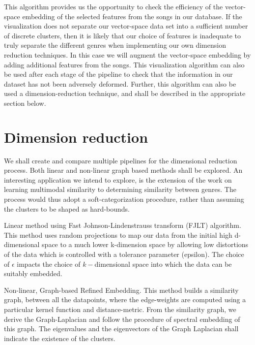 \documentclass[12pt]{article}
\begin{document}
This algorithm provides us the opportunity to check the efficiency of the vector-space embedding of the selected features from the songs in our database.  If the visualization does not separate our vector-space data set into a sufficient number of discrete clusters, then it is likely that our choice of features is inadequate to truly separate the different genres when implementing our own dimension reduction techniques.  In this case we will augment the vector-space embedding by adding additional features from the songs.  This visualization algorithm can also be used after each stage of the pipeline to check that the information in our dataset has not been adversely deformed. Further, this algorithm can also be used a dimension-reduction technique, and shall be described in the appropriate section below.


\section{Dimension reduction}
We shall create and compare multiple pipelines for the dimensional reduction process. Both linear and non-linear graph based methods shall be explored. An interesting application we intend to explore, is the extension of the work on learning multimodal similarity \cite{multimodalSimilarity} to determining similarity between genres. The process would thus adopt a soft-categorization procedure, rather than assuming the clusters to be shaped as hard-bounds.

Linear method using Fast Johnson-Lindenstrauss transform (FJLT) algorithm.  This method uses random projections to map our data from the initial high d-dimensional space to a much lower k-dimension space by allowing low distortions of the data which is controlled with a tolerance parameter (epsilon). The choice of $\epsilon$ impacts the choice of $k-$dimensional space into which the data can be suitably embedded.

Non-linear, Graph-based Refined Embedding. This method builds a similarity graph, between all the datapoints, where the edge-weights are computed using a particular kernel function and distance-metric. From the similarity graph, we derive the Graph-Laplacian and follow the procedure of spectral embedding of this graph. The eigenvalues and the eigenvectors of the Graph Laplacian shall indicate the existence of the clusters. 
\end{document}

